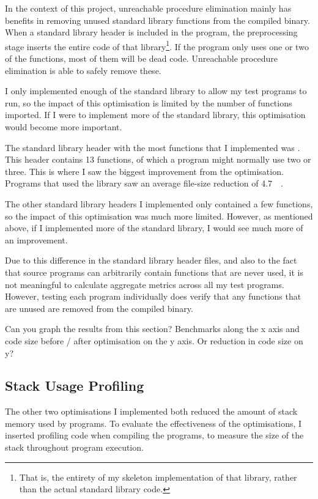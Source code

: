 \documentclass[00-main.tex]{subfiles}
\begin{document}
In the context of this project, unreachable procedure elimination mainly has benefits in removing unused standard library functions from the compiled binary.
When a standard library header is included in the program, the preprocessing stage inserts the entire code of that library\footnote{That is, the entirety of my skeleton implementation of that library, rather than the actual standard library code.}.
If the program only uses one or two of the functions, most of them will be dead code.
Unreachable procedure elimination is able to safely remove these.

I only implemented enough of the standard library to allow my test programs to run, so the impact of this optimisation is limited by the number of functions imported.
If I were to implement more of the standard library, this optimisation would become more important.

The standard library header with the most functions that I implemented was .
This header contains 13 functions, of which a program might normally use two or three.
This is where I saw the biggest improvement from the optimisation.
Programs that used the  library saw an average file-size reduction of \SI{4.7}{\kilo\byte}.

The other standard library headers I implemented only contained a few functions, so the impact of this optimisation was much more limited. However, as mentioned above, if I implemented more of the standard library, I would see much more of an improvement.

Due to this difference in the standard library header files, and also to the fact that source programs can arbitrarily contain functions that are never used, it is not meaningful to calculate aggregate metrics across all my test programs.
However, testing each program individually does verify that any functions that are unused are removed from the compiled binary.

\begin{Comment}
Can you graph the results from this section?  Benchmarks along the x
axis and code size before / after optimisation on the y axis.  Or
reduction in code size on y?
\end{Comment}

\subsection{Stack Usage Profiling}

The other two optimisations I implemented both reduced the amount of stack memory used by programs.
To evaluate the effectiveness of the optimisations, I inserted profiling code when compiling the programs, to measure the size of the stack throughout program execution.
\end{document}
